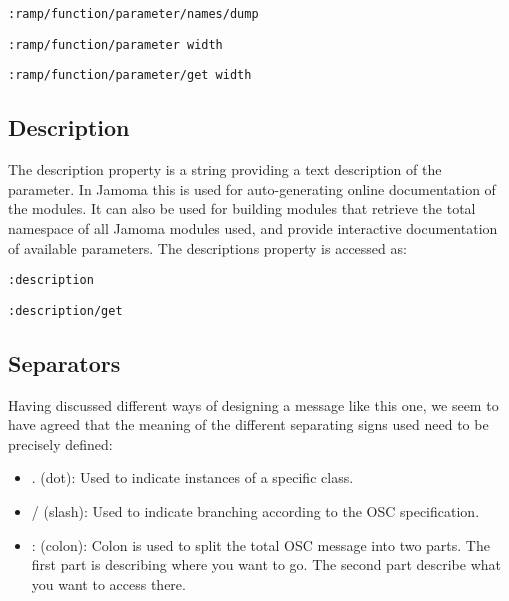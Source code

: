 \documentclass{sig-alternate}
\begin{document}
\texttt{:ramp/function/parameter/names/dump}

\texttt{:ramp/function/parameter width}

\texttt{:ramp/function/parameter/get width}







\subsection{Description} %
\label{sub:description}

The description property is a string providing a text description of the parameter. In Jamoma this is used for auto-generating online documentation of the modules. It can also be used for building modules that retrieve the total namespace of all Jamoma modules used, and provide interactive documentation of available parameters. The descriptions property is accessed as:

\texttt{:description}

\texttt{:description/get}





\subsection{Separators} %
\label{sub:separators}


Having discussed different ways of designing a message like this one, we seem to have agreed that the meaning of the different separating signs used need to be precisely defined:

\begin{itemize}

	\item. (dot): Used to indicate instances of a specific class.
	\item / (slash): Used to indicate branching according to the OSC specification.
	\item : (colon): Colon is used to split the total OSC message into two parts. The first part is describing where you want to go. The second part describe what you want to access there.
\end{itemize}

\end{document}
